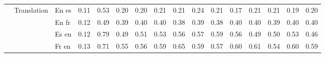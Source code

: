 \begin{center}
\begin{longtable}{lllrrrrrrrrrrrrr}
\cline{2-16}
 & \multirow[t]{4}{*}{Translation} & En es & 0.11 & 0.53 & 0.20 & 0.20 & 0.21 & 0.21 & 0.24 & 0.21 & 0.17 & 0.21 & 0.21 & 0.19 & 0.20 \\
 &  & En fr & 0.12 & 0.49 & 0.39 & 0.40 & 0.40 & 0.38 & 0.39 & 0.38 & 0.40 & 0.40 & 0.39 & 0.40 & 0.40 \\
 &  & Es en & 0.12 & 0.79 & 0.49 & 0.51 & 0.53 & 0.56 & 0.57 & 0.59 & 0.56 & 0.49 & 0.50 & 0.53 & 0.46 \\
 &  & Fr en & 0.13 & 0.71 & 0.55 & 0.56 & 0.59 & 0.65 & 0.59 & 0.57 & 0.60 & 0.61 & 0.54 & 0.60 & 0.59 \\
\cline{1-16} \cline{2-16}
\bottomrule
\end{longtable}

\end{center}
\twocolumn